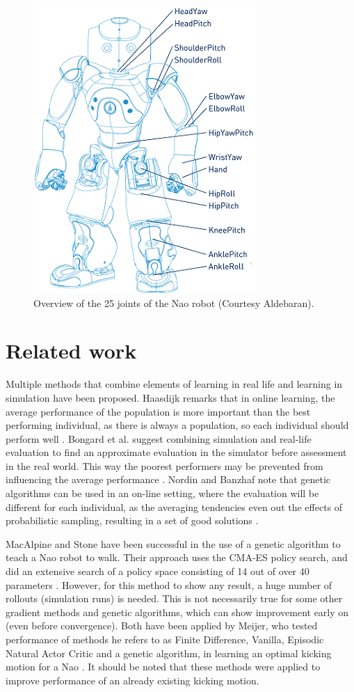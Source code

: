 \documentclass{article}
\begin{document}
\begin{figure}
	\center
	\includegraphics[scale=.6]{images/naospecsJoints}
	\caption{Overview of the 25 joints of the Nao robot (Courtesy Aldebaran).}
	\label{fig:joints}
\end{figure}

\section{Related work}
Multiple methods that combine elements of learning in real life and learning in simulation
have been proposed. Haasdijk remarks that in online learning, the average
performance of the population is more important than the best performing
individual, as there is always a population, so each individual should perform
well \cite{haasdijk2012never}. Bongard et al. suggest combining simulation
and real-life evaluation to find an approximate evaluation in the simulator
before assessment in the real world. This way the poorest performers may be
prevented from influencing the average performance \cite{bongard2006resilient}.
Nordin and Banzhaf note that genetic algorithms can be used in an on-line
setting, where the evaluation will be different for each individual, as the
averaging tendencies even out the effects of probabilistic sampling, resulting
in a set of good solutions \cite{nordin1997line}.

MacAlpine and Stone have been successful in the use of a genetic algorithm
to teach a Nao robot to walk. Their approach uses the CMA-ES policy search,
and did an extensive search of a policy space consisting of 14 out of over 40
parameters \cite{macalpineusing}. However, for this method to show any result, 
a huge number of rollouts (simulation runs) is needed. This is not necessarily true 
for some other gradient methods and genetic algorithms, which can show improvement 
early on (even before convergence). Both have been applied by Meijer, who tested performance 
of methods he refers to as Finite Difference, Vanilla, Episodic Natural Actor Critic and a 
genetic algorithm, in learning an optimal kicking motion for a Nao \cite{meijer2012getting}. 
It should be noted that these methods were applied to improve performance of an already 
existing kicking motion. 
\end{document}
